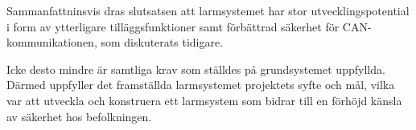 Sammanfattninsvis dras slutsatsen att larmsystemet har stor utvecklingspotential i form av ytterligare tilläggsfunktioner samt förbättrad säkerhet för CAN-kommunikationen, som diskuterats tidigare. 

Icke desto mindre är samtliga krav som ställdes på grundsystemet uppfyllda. Därmed uppfyller det framställda larmsystemet projektets syfte och mål, vilka var att utveckla och konstruera ett larmsystem som bidrar till en förhöjd känsla av säkerhet hos befolkningen.

